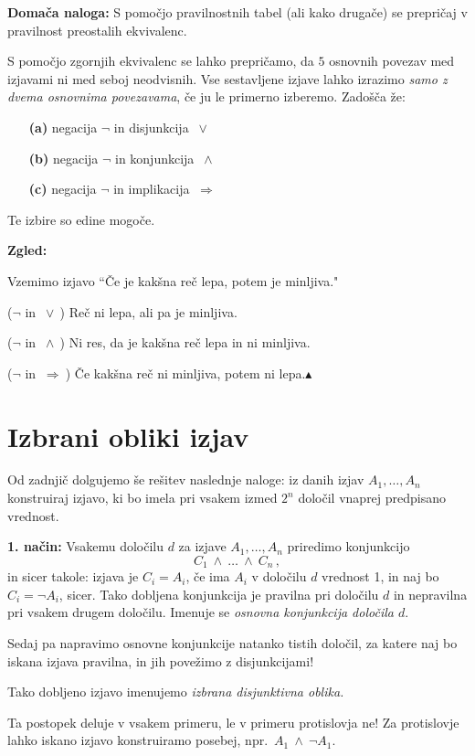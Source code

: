 \documentclass[11pt,paper=b5,footinclude,headinclude]{scrbook} %
\def\ali {{~\vee~}}
\def\inn {{~\wedge~}}
\def\sledi {{~\Rightarrow~}}
\def\zgled{\noindent\textbf{\color{blue} Zgled: }}
\def\kz{{\hfill{\color{blue}$\blacktriangle$}}}%
\begin{document}
\textbf{ Domača naloga:} S pomočjo pravilnostnih tabel (ali kako drugače) se prepričaj v pravilnost
preostalih ekvivalenc.

\bigskip
S pomočjo zgornjih ekvivalenc se lahko prepričamo, da $5$ osnovnih povezav med izjavami ni med seboj neodvisnih.
Vse sestavljene izjave lahko izrazimo {\em samo z dvema osnovnima povezavama}, če ju le primerno izberemo.
Zadošča že:
\begin{enumerate}
  \item[\textbf{ (a)}] negacija $\neg$ in  disjunkcija $\ali$
  \item[\textbf{ (b)}] negacija $\neg$ in konjunkcija $\inn$
  \item[\textbf{ (c)}] negacija $\neg$ in implikacija $\sledi$
\end{enumerate}
Te izbire so edine mogoče.

\medskip
\zgled

Vzemimo izjavo ``Če je kakšna reč lepa, potem je minljiva."

($\neg$ in $\ali$) Reč ni lepa, ali pa je minljiva.

($\neg$ in $\inn$) Ni res, da je kakšna reč lepa in ni minljiva.

($\neg$ in $\sledi$) Če kakšna reč ni minljiva, potem ni lepa.\kz


\section{Izbrani obliki izjav}

Od zadnjič dolgujemo še rešitev naslednje naloge: iz danih izjav $A_1,\ldots, A_n$ konstruiraj izjavo,
ki bo imela pri vsakem izmed $2^n$ določil vnaprej predpisano vrednost.

\textbf{ 1. način:}
Vsakemu določilu $d$ za izjave $A_1,\ldots, A_n$ priredimo konjunkcijo
$$C_1\inn \ldots \inn C_n\,,$$
in sicer takole: izjava je $C_i = A_i$, če ima $A_i$ v določilu $d$ vrednost 1, in naj bo
$C_i = \neg A_i$, sicer.
Tako dobljena konjunkcija je pravilna pri določilu $d$ in nepravilna pri vsakem drugem določilu.
Imenuje se {\em osnovna konjunkcija določila $d$}.

Sedaj pa napravimo osnovne konjunkcije natanko tistih določil, za katere naj
bo iskana izjava pravilna, in jih povežimo z disjunkcijami!

Tako dobljeno izjavo imenujemo {\em izbrana disjunktivna oblika.}

Ta postopek deluje v vsakem primeru, le v primeru protislovja ne! Za protislovje lahko iskano izjavo
konstruiramo posebej, npr.~$A_1\inn \neg A_1$.
\end{document}
